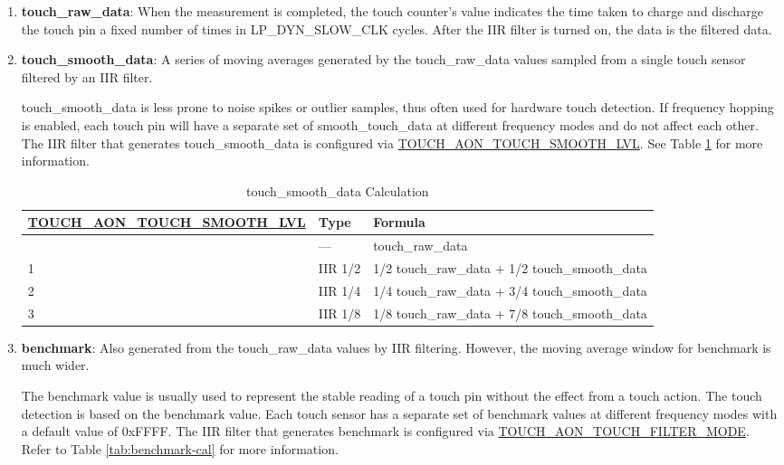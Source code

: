 \documentclass[main\_\_EN.tex]{subfiles}
\begin{document}
\begin{enumerate}
    \item \textbf{touch\_raw\_data}: When the measurement is completed, the touch counter's value indicates the time taken to charge and discharge the touch pin a fixed number of times in LP\_DYN\_SLOW\_CLK cycles. After the IIR filter is turned on, the data is the filtered data.

    \item \textbf{touch\_smooth\_data}: A series of moving averages generated by the touch\_raw\_data values sampled from a single touch sensor filtered by an IIR filter.

    touch\_smooth\_data is less prone to noise spikes or outlier samples, thus often used for hardware touch detection. If frequency hopping is enabled, each touch pin will have a separate set of smooth\_touch\_data at different frequency modes and do not affect each other. The IIR filter that generates touch\_smooth\_data is configured via \hyperref[fielddesc:TOUCHAONTOUCHSMOOTHLVL]{TOUCH\_AON\_TOUCH\_SMOOTH\_LVL}. See Table \ref{tab:smooth-cal} for more information.

    \begin{longtable}[c]{|p{5.5 cm}|p{1.5cm}|p{8.5cm}|}
        \caption{touch\_smooth\_data Calculation}
        \label{tab:smooth-cal}\\
        \hline
        \rowcolor{lightgray}
        \textbf{\hyperref[fielddesc:TOUCHAONTOUCHSMOOTHLVL]{TOUCH\_AON\_TOUCH\_SMOOTH\_LVL}} & \textbf{Type} & \textbf{Formula}\\ 
        \hline
        \endhead
        \endfoot
        \endlastfoot
        0  & --- & touch\_raw\_data  \\\hline
        1  & IIR 1/2 & 1/2 touch\_raw\_data + 1/2 touch\_smooth\_data \\\hline
        2  & IIR 1/4 & 1/4 touch\_raw\_data + 3/4 touch\_smooth\_data \\\hline
        3  & IIR 1/8 & 1/8 touch\_raw\_data + 7/8 touch\_smooth\_data \\\hline
    \end{longtable}

    \item \textbf{benchmark}: Also generated from the touch\_raw\_data values by IIR filtering. However, the moving average window for benchmark is much wider.
    
The benchmark value is usually used to represent the stable reading of a touch pin without the effect from a touch action. The touch detection is based on the benchmark value. Each touch sensor has a separate set of benchmark values at different frequency modes with a default value of 0xFFFF. The IIR filter that generates benchmark is configured via \hyperref[fielddesc:TOUCHAONTOUCHFILTERMODE]{TOUCH\_AON\_TOUCH\_FILTER\_MODE}. Refer to Table \ref{tab:benchmark-cal} for more information.


\end{enumerate}
\end{document}
